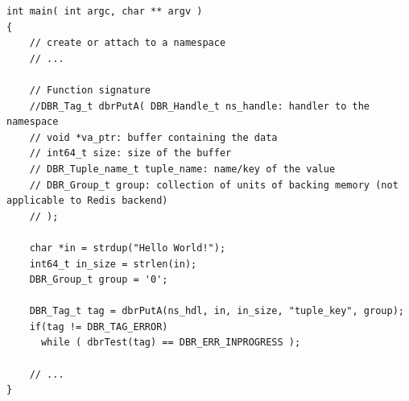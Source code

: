 \begin{lstlisting}[style=mystyle,basicstyle=\scriptsize\ttfamily,caption=Push data to the namespace (non-blocking), label=code:putA]
int main( int argc, char ** argv )
{
	// create or attach to a namespace
	// ...
	
	// Function signature
    //DBR_Tag_t dbrPutA( DBR_Handle_t ns_handle: handler to the namespace
    // void *va_ptr: buffer containing the data
    // int64_t size: size of the buffer
    // DBR_Tuple_name_t tuple_name: name/key of the value
    // DBR_Group_t group: collection of units of backing memory (not applicable to Redis backend)
    // );
    
    char *in = strdup("Hello World!");
    int64_t in_size = strlen(in);	
    DBR_Group_t group = '0';
    
    DBR_Tag_t tag = dbrPutA(ns_hdl, in, in_size, "tuple_key", group);
    if(tag != DBR_TAG_ERROR)
      while ( dbrTest(tag) == DBR_ERR_INPROGRESS );
		
	// ...
}
\end{lstlisting}

